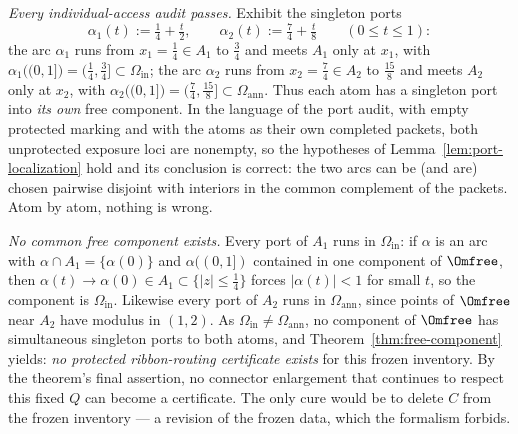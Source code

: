 \begin{example}
\emph{Every individual-access audit passes.} Exhibit the singleton ports
\[
\alpha_1(t):=\tfrac14+\tfrac t2,
\qquad
\alpha_2(t):=\tfrac74+\tfrac t8
\qquad(0\le t\le1):
\]
the arc $\alpha_1$ runs from $x_1=\tfrac14\in A_1$ to $\tfrac34$ and meets $A_1$ only at
$x_1$, with $\alpha_1\bigl((0,1]\bigr)=(\tfrac14,\tfrac34]\subset\Omega_{\mathrm{in}}$;
the arc $\alpha_2$ runs from $x_2=\tfrac74\in A_2$ to $\tfrac{15}8$ and meets $A_2$ only
at $x_2$, with
$\alpha_2\bigl((0,1]\bigr)=(\tfrac74,\tfrac{15}8]\subset\Omega_{\mathrm{ann}}$. Thus
each atom has a singleton port into \emph{its own} free component. In the language of
the port audit, with empty protected marking and with the atoms as their own completed
packets, both unprotected exposure loci are nonempty, so the hypotheses of
Lemma~\ref{lem:port-localization} hold and its conclusion is correct: the two arcs can
be (and are) chosen pairwise disjoint with interiors in the common complement of the
packets. Atom by atom, nothing is wrong.

\emph{No common free component exists.} Every port of $A_1$ runs in
$\Omega_{\mathrm{in}}$: if $\alpha$ is an arc with
$\alpha\cap A_1=\{\alpha(0)\}$ and $\alpha((0,1])$ contained in one component of
$\Omfree$, then $\alpha(t)\to\alpha(0)\in A_1\subset\{|z|\le\tfrac14\}$ forces
$|\alpha(t)|<1$ for small $t$, so the component is $\Omega_{\mathrm{in}}$. Likewise
every port of $A_2$ runs in $\Omega_{\mathrm{ann}}$, since points of $\Omfree$ near
$A_2$ have modulus in $(1,2)$. As $\Omega_{\mathrm{in}}\neq\Omega_{\mathrm{ann}}$, no
component of $\Omfree$ has simultaneous singleton ports to both atoms, and
Theorem~\ref{thm:free-component} yields: \emph{no protected ribbon-routing certificate
exists} for this frozen inventory.  By the theorem's final assertion, no
connector enlargement that continues to respect this fixed $Q$ can become a
certificate.  The only cure
would be to delete $C$ from the frozen inventory --- a revision of the frozen data,
which the formalism forbids.
\end{example}

